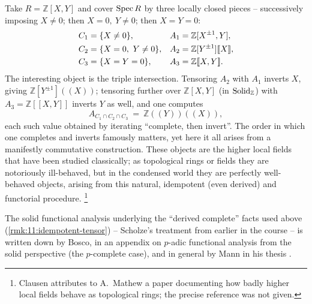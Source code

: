 \begin{example}
\label{ex:11:higher-local-fields}
Take $R=\mathbb{Z}[X,Y]$ and cover $\operatorname{Spec} R$ by three locally closed pieces
-- successively imposing $X\neq0$; then $X=0,\ Y\neq0$; then $X=Y=0$:
\begin{align}
\label{eq:11:hlf-pieces}
C_{1}&=\{X\neq 0\}, & A_{1}&=\mathbb{Z}[X^{\pm1},Y],\notag\\
C_{2}&=\{X=0,\ Y\neq 0\}, & A_{2}&=\mathbb{Z}[Y^{\pm1}][\![X]\!],\\
C_{3}&=\{X=Y=0\}, & A_{3}&=\mathbb{Z}[\![X,Y]\!].\notag
\end{align}
The interesting object is the triple intersection. Tensoring $A_{2}$ with
$A_{1}$ inverts $X$, giving $\mathbb{Z}[Y^{\pm1}](\!(X)\!)$; tensoring further
over $\mathbb{Z}[X,Y]$ (in $\mathrm{Solid}_{\mathbb{Z}}$) with $A_{3}=\mathbb{Z}[\![X,Y]
\!]$ inverts $Y$ as well, and one computes
\begin{equation*}
A_{C_{1}\cap C_{2}\cap C_{3}}\ =\ \mathbb{Z}(\!(Y)\!)(\!(X)\!),
\end{equation*}
each such value obtained by iterating ``complete, then invert''. The order in
which one completes and inverts famously matters, yet here it all arises from a
manifestly commutative construction. These objects are the higher local fields
that have been studied classically; as topological rings or fields they are
notoriously ill-behaved, but in the condensed world they are perfectly
well-behaved objects, arising from this natural, idempotent (even derived) and
functorial procedure.%
\footnote{Clausen attributes to A.~Mathew a paper documenting how badly higher
local fields behave as topological rings; the precise reference was not given.}
\end{example}

\begin{remark}
\label{rmk:11:references}
The solid functional analysis underlying the ``derived complete'' facts used
above (\cref{rmk:11:idempotent-tensor}) -- Scholze's treatment from earlier in
the course -- is written down by Bosco, in an appendix on $p$-adic functional
analysis from the solid perspective \cite{bosco2023rationalpadichodgetheory}
(the $p$-complete case), and in general by Mann in his thesis
\cite{mann2022padic6functorformalismrigidanalytic}.
\end{remark}

